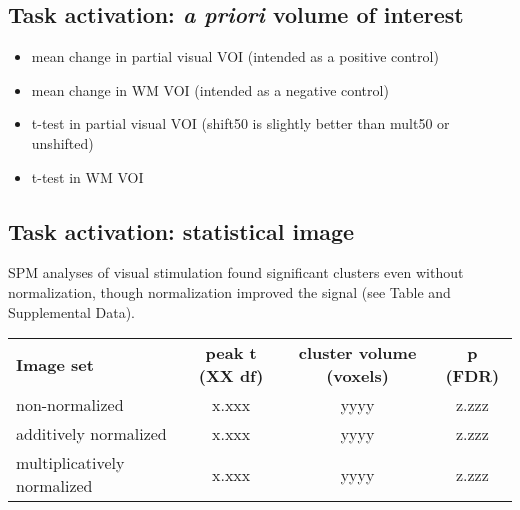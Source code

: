 \subsection{Task activation: \textit{a priori} volume of interest}
  \begin{itemize} 
    \item mean change in partial visual VOI (intended as a positive control)
    \item mean change in WM VOI (intended as a negative control)
    \item t-test in partial visual VOI (shift50 is slightly better than mult50 or unshifted)
    \item t-test in WM VOI
  \end{itemize}

\subsection{Task activation: statistical image}
SPM analyses of visual stimulation found significant clusters even without normalization, though normalization improved the signal (see Table and Supplemental Data).

\begin{tabular}{lccc}
  \textbf{Image set} & \textbf{peak t (XX df)} & \textbf{cluster volume (voxels)} & \textbf{p (FDR)} \\
  non-normalized & x.xxx & yyyy & z.zzz \\
  additively normalized & x.xxx & yyyy & z.zzz \\
  multiplicatively normalized & x.xxx & yyyy & z.zzz \\
\end{tabular}
